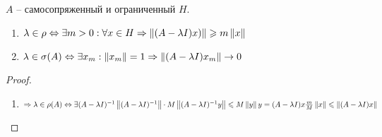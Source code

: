 \begin{theorem}
    $A$ -- самосопряженный и ограниченный $H$.
    \begin{enumerate}
        \item
            $\lambda \in \rho \Leftrightarrow 
            \exists m > 0: \forall x \in H \Rightarrow
            \left\|(A - \lambda I)x)\right\| \geqslant m \left\|x\right\|$
        \item
            $\lambda \in \sigma(A) \Leftrightarrow
            \exists x_m: \left\|x_m\right\| = 1 \Rightarrow
            \left\|(A - \lambda I)x_m\right\| \rightarrow 0$
    \end{enumerate}	
\end{theorem}
\begin{proof}
    \begin{enumerate}
    \item $\Rightarrow
        \lambda \in \rho (A) \Leftrightarrow \exists (A - \lambda I)^{-1}
        \left\|(A - \lambda I)^{-1}\right\| \cdot M \\
        \left\|(A - \lambda I)^{-1}y\right\| \leqslant M \left\|y\right\| \\
        y = (A - \lambda I)x \\
        \frac{m}{M} \left\|x\right\| \leqslant \left\|(A -\lambda I)x\right\|$
    \end{enumerate}
\end{proof}
\pagebreak
